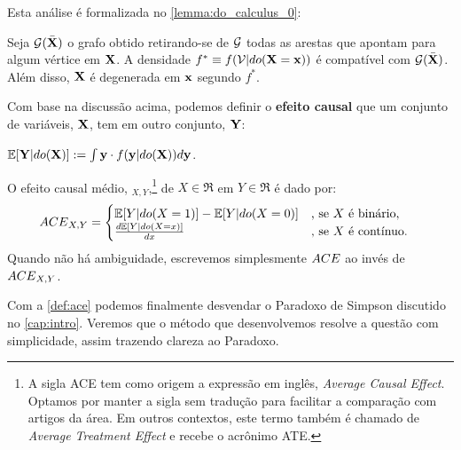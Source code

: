 Esta análise é formalizada no \cref{lemma:do_calculus_0}:

\begin{lemma}
 \label{lemma:do_calculus_0}
 Seja ${\mathcal G}(\bar{{\mathbf{X}}})$ o grafo obtido
 retirando-se de ${\mathcal G}$ 
 todas as arestas que apontam para 
 algum vértice em ${\mathbf{X}}$.
 A densidade $f^* \equiv f({\mathcal V}|do({\mathbf{X}}={\mathbf{x}}))$ é 
 compatível com ${\mathcal G}(\bar{{\mathbf{X}}})$. 
 Além disso, ${\mathbf{X}}$ é degenerada em ${\mathbf{x}}$ segundo $f^*$.
\end{lemma}

Com base na discussão acima, podemos definir
o \textbf{efeito causal} que um conjunto de variáveis, ${\mathbf{X}}$,
tem em outro conjunto, ${\mathbf{Y}}$:

\begin{definition}
 \label{def:exp_inter}
 ${\mathbb E}[{\mathbf{Y}}|do({\mathbf{X}})] := \int {\mathbf{y}} \cdot f({\mathbf{y}}|do({\mathbf{X}})) d{\mathbf{y}}$.
\end{definition}

\begin{definition}
 \label{def:ace}
 O efeito causal médio, \ACE$_{X,Y}$,\footnote{
 A sigla ACE tem como origem a expressão em inglês,
 \textit{Average Causal Effect}. Optamos por manter a sigla 
 sem tradução para facilitar a comparação com artigos da área.
 Em outros contextos, este termo também é chamado de 
 \textit{Average Treatment Effect} e recebe o acrônimo ATE.}
 de $X \in \Re$ em $Y \in \Re$ é dado por:
 \begin{align*}
  {ACE}_{X,Y} &=
  \begin{cases}
   {\mathbb E}[Y|do(X=1)] - {\mathbb E}[Y|do(X=0)]
   & \text{, se $X$ é binário}, \\
   \frac{d{\mathbb E}[Y|do(X=x)]}{dx}
   & \text{, se $X$ é contínuo}.
  \end{cases}
 \end{align*}
 Quando não há ambiguidade, escrevemos simplesmente
 ${ACE}$ ao invés de ${ACE}_{X,Y}$.
\end{definition}

Com a \cref{def:ace} podemos finalmente desvendar
o Paradoxo de Simpson discutido no \cref{cap:intro}.
Veremos que o método que desenvolvemos resolve
a questão com simplicidade,
assim trazendo clareza ao Paradoxo.

